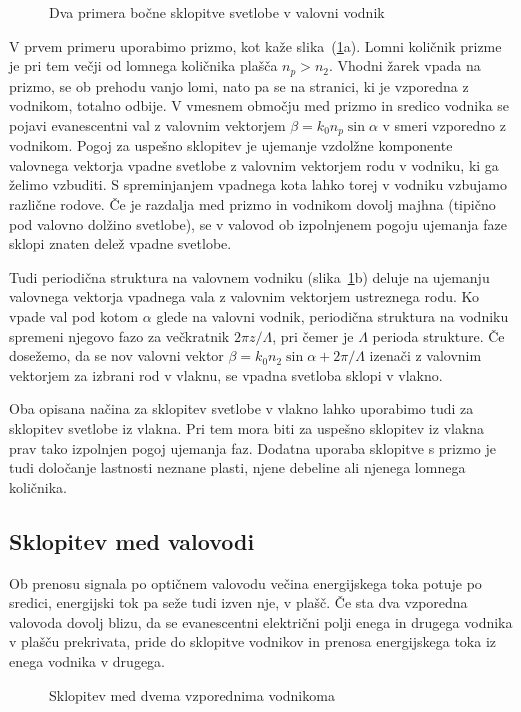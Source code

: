 \begin{figure}[h]
\centering
\def\svgwidth{120truemm} 
 
\caption{Dva primera bočne sklopitve svetlobe v valovni vodnik}
\label{fig:coupler}
\end{figure}
V prvem primeru uporabimo prizmo, kot kaže slika~(\ref{fig:coupler}a). Lomni količnik prizme
je pri tem večji od lomnega količnika plašča $n_p > n_2$.
Vhodni žarek vpada na prizmo, se ob prehodu vanjo lomi, nato pa se na stranici, ki je vzporedna
z vodnikom, totalno odbije. V vmesnem območju med prizmo in sredico vodnika se pojavi evanescentni
val z valovnim vektorjem $\beta  = k_0 n_p \sin \alpha$ v smeri vzporedno z vodnikom. Pogoj za uspešno 
sklopitev je ujemanje vzdolžne komponente valovnega vektorja vpadne svetlobe z valovnim 
vektorjem rodu v vodniku, ki ga želimo vzbuditi. 
S spreminjanjem vpadnega kota lahko torej v vodniku vzbujamo različne rodove. 
Če je razdalja med prizmo in vodnikom dovolj majhna (tipično pod valovno dolžino svetlobe), se v 
valovod ob izpolnjenem pogoju ujemanja faze sklopi znaten delež vpadne svetlobe.

Tudi periodična struktura na valovnem vodniku (slika~\ref{fig:coupler}b) deluje na 
ujemanju valovnega vektorja vpadnega vala z valovnim vektorjem ustreznega rodu.
Ko vpade val pod kotom $\alpha$ glede na valovni vodnik, periodična struktura na vodniku 
spremeni njegovo fazo za večkratnik $2 \pi z/\Lambda$, pri čemer je $\Lambda$ perioda strukture.
Če dosežemo, da se nov valovni vektor $\beta = k_0 n_2 \sin \alpha+ 2 \pi/\Lambda$ izenači z valovnim 
vektorjem za izbrani rod v vlaknu, se vpadna svetloba sklopi v vlakno.

\begin{remark}
 Oba opisana načina za sklopitev svetlobe v vlakno lahko uporabimo tudi za sklopitev svetlobe 
 iz vlakna. Pri tem mora biti za uspešno sklopitev iz vlakna prav tako izpolnjen pogoj ujemanja faz.
 Dodatna uporaba sklopitve s prizmo je tudi določanje lastnosti neznane plasti, njene debeline
 ali njenega lomnega količnika.
\end{remark}

\subsection*{Sklopitev med valovodi}
Ob prenosu signala po optičnem valovodu večina energijskega toka potuje po sredici,
energijski tok pa seže tudi izven nje, v plašč. Če sta dva vzporedna valovoda dovolj blizu, da
se evanescentni električni polji enega in drugega vodnika v plašču prekrivata, pride do 
sklopitve vodnikov in prenosa energijskega toka iz enega vodnika v drugega. 
\begin{figure}[h]
\centering
\def\svgwidth{80truemm} 
 
\caption{Sklopitev med dvema vzporednima vodnikoma}
\label{fig:fcoupler}
\end{figure}

